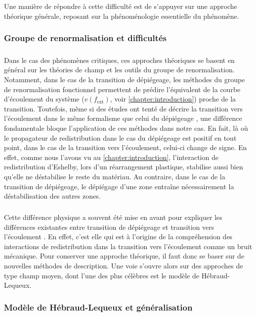 \subparagraph{}Une manière de répondre à cette difficulté est de s'appuyer sur une approche théorique générale, reposant sur la phénoménologie essentielle du phénomène.

\subsubsection{Groupe de renormalisation et difficultés}

\label{sec:TheoEPM}

\subparagraph{}Dans le cas des phénomènes critiques, ces approches théoriques se basent en général sur les théories de champ et les outils du groupe de renormalisation. Notamment, dans le cas de la transition de dépiégeage, les méthodes du groupe de renormalisation fonctionnel permettent de prédire l'équivalent de la courbe d'écoulement du système ($v(f_\text{ext})$, voir \autoref{chapter:introduction}) proche de la transition. Toutefois, même si des études ont tenté de décrire la transition vers l'écoulement dans le même formalisme que celui du dépiégeage \cite{tyukodi_depinning_2016}, une différence fondamentale bloque l'application de ces méthodes dans notre cas. En fait, là où le propagateur de redistribution dans le cas du dépiégeage est positif en tout point, dans le cas de la transition vers l'écoulement, celui-ci change de signe. En effet, comme nous l'avons vu au \autoref{chapter:introduction}, l'interaction de redistribution d'Eshelby, lors d'un réarrangement plastique, stabilise aussi bien qu'elle ne déstabilise le reste du matériau. Au contraire, dans le cas de la transition de dépiégeage, le dépiégage d'une zone entraîne nécessairement la déstabilisation des autres zones.

\subparagraph{}Cette différence physique a souvent été mise en avant pour expliquer les différences existantes entre transition de dépiégeage et transition vers l'écoulement \cite{lin_scaling_2014,lin_mean-field_2016,nicolas_deformation_2018, ferrero_elastic_2019}. En effet, c'est elle qui est à l'origine de la compréhension des interactions de redistribution dans la transition vers l'écoulement comme un bruit mécanique. Pour conserver une approche théorique, il faut donc se baser sur de nouvelles méthodes de description. Une voie s'ouvre alors sur des approches de type champ moyen, dont l'une des plus célèbres est le modèle de Hébraud-Lequeux.

\subsubsection{Modèle de Hébraud-Lequeux et généralisation}

